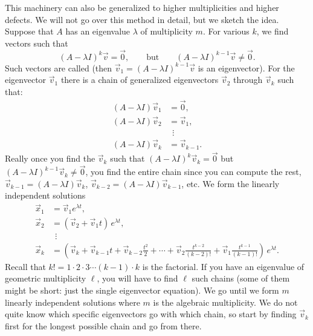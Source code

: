 This machinery can also be generalized to higher multiplicities
and higher defects.
We will not go over this method in detail, but we sketch the idea.
Suppose that $A$
has an eigenvalue $\lambda$ of multiplicity $m$.
For various $k$,
we find vectors such that
\begin{equation*}
{(A - \lambda I)}^k \vec{v} = \vec{0},
\qquad \text{but} \qquad
{(A - \lambda I)}^{k-1} \vec{v} \neq \vec{0}.
\end{equation*}
Such vectors are called \emph{} (then
$\vec{v}_1 = {(A - \lambda I)}^{k-1} \vec{v}$ is an eigenvector).
For the
eigenvector $\vec{v}_1$ there is a chain of generalized eigenvectors
$\vec{v}_2$ through $\vec{v}_k$ such that:
\begin{align*}
(A - \lambda I) \vec{v}_1 & = \vec{0} , \\
(A - \lambda I) \vec{v}_2 & = \vec{v}_1 , \\
& ~~\vdots \\
(A - \lambda I) \vec{v}_k & = \vec{v}_{k-1} .
\end{align*}
Really once you find the $\vec{v}_k$ such that
${(A - \lambda I)}^k \vec{v}_k = \vec{0}$ but
${(A - \lambda I)}^{k-1} \vec{v}_k \neq \vec{0}$, you find the entire
chain since you can compute the rest,
$\vec{v}_{k-1} = (A - \lambda I) \vec{v}_k$,
$\vec{v}_{k-2} = (A - \lambda I) \vec{v}_{k-1}$, etc.
We form the linearly independent solutions
\begin{align*}
\vec{x}_1 & = \vec{v}_1 e^{\lambda t} , \\
\vec{x}_2 & = ( \vec{v}_2 + \vec{v}_1 t ) \, e^{\lambda t} , \\
& ~~\vdots \\
\vec{x}_k & = \left( \vec{v}_k + \vec{v}_{k-1} t +
\vec{v}_{k-2} \frac{t^2}{2} +
\cdots + \vec{v}_2 \frac{t^{k-2}}{(k-2)!} + \vec{v}_1 \frac{t^{k-1}}{(k-1)!}
\right) \, e^{\lambda t} .
\end{align*}
Recall that $k! = 1 \cdot 2 \cdot 3 \cdots (k-1) \cdot k$ is the factorial.
If you have an eigenvalue of geometric multiplicity $\ell$,
you will have to find $\ell$ such chains (some of them might be
short: just the single eigenvector equation).
We go until we form $m$ linearly independent solutions where
$m$ is the algebraic multiplicity.
We do not quite know which specific eigenvectors go with which chain, so
start by finding $\vec{v}_k$ first for the longest possible chain and
go from there.

